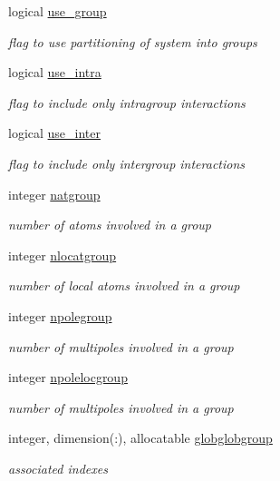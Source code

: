 \begin{DoxyCompactItemize}
logical \hyperlink{classgroup_a372533e525e756e9bcc417cfd240e5c3}{use\-\_\-group}
\begin{DoxyCompactList}\small\item\em flag to use partitioning of system into groups \end{DoxyCompactList}\item 
logical \hyperlink{classgroup_a6fac74f906f63346aabc068efa306815}{use\-\_\-intra}
\begin{DoxyCompactList}\small\item\em flag to include only intragroup interactions \end{DoxyCompactList}\item 
logical \hyperlink{classgroup_a4cc36830bfcafdc583968b51277985f5}{use\-\_\-inter}
\begin{DoxyCompactList}\small\item\em flag to include only intergroup interactions \end{DoxyCompactList}\item 
integer \hyperlink{classgroup_ae394ac41a0b82e71ce39385f4e864fab}{natgroup}
\begin{DoxyCompactList}\small\item\em number of atoms involved in a group \end{DoxyCompactList}\item 
integer \hyperlink{classgroup_a3f062dde36b7ccc9f1b0d92cf9a9eff0}{nlocatgroup}
\begin{DoxyCompactList}\small\item\em number of local atoms involved in a group \end{DoxyCompactList}\item 
integer \hyperlink{classgroup_ad4f3e6a29572d0b9a223c8b6e8822eb2}{npolegroup}
\begin{DoxyCompactList}\small\item\em number of multipoles involved in a group \end{DoxyCompactList}\item 
integer \hyperlink{classgroup_a08c59b59b51a6eb8cd4256954b1a10e9}{npolelocgroup}
\begin{DoxyCompactList}\small\item\em number of multipoles involved in a group \end{DoxyCompactList}\item 
integer, dimension(\-:), allocatable \hyperlink{classgroup_a74b6bce17ca40288666afb3985dfb6bd}{globglobgroup}
\begin{DoxyCompactList}\small\item\em associated indexes \end{DoxyCompactList}\item 

\end{DoxyCompactItemize}
